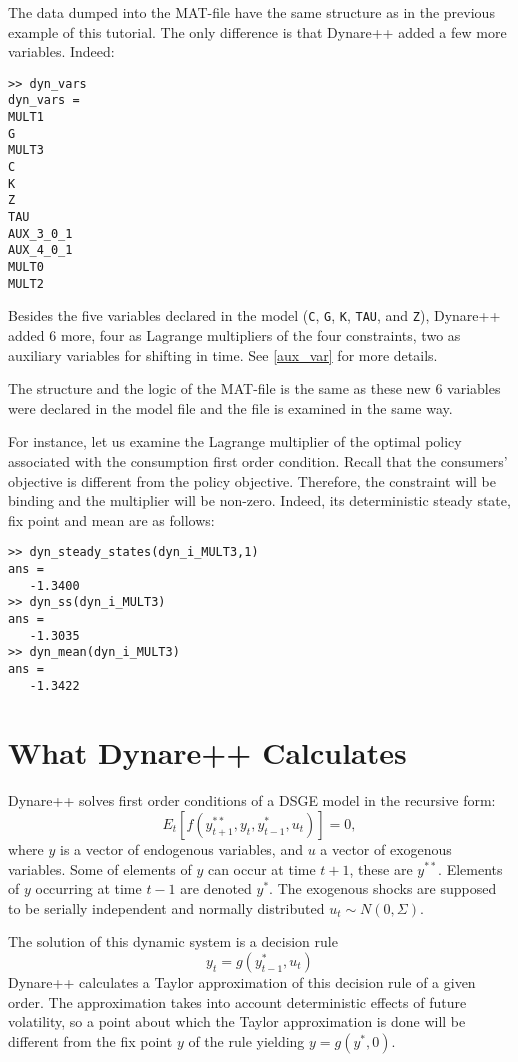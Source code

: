 \documentclass[10pt]{article}
\begin{document}
The data dumped into the MAT-file have the same structure as in the
previous example of this tutorial. The only difference is that
Dynare++ added a few more variables. Indeed:
{\small
\begin{verbatim}
>> dyn_vars
dyn_vars =
MULT1    
G        
MULT3    
C        
K        
Z        
TAU      
AUX_3_0_1
AUX_4_0_1
MULT0    
MULT2    
\end{verbatim}
}
Besides the five variables declared in the model ({\tt C}, {\tt G},
{\tt K}, {\tt TAU}, and {\tt Z}), Dy\-na\-re++ added 6 more, four as Lagrange
multipliers of the four constraints, two as auxiliary variables for
shifting in time. See \ref{aux_var} for more details.

The structure and the logic of the MAT-file is the same as these new 6
variables were declared in the model file and the file is examined in
the same way.

For instance, let us examine the Lagrange multiplier of the optimal
policy associated with the consumption first order condition. Recall
that the consumers' objective is different from the policy
objective. Therefore, the constraint will be binding and the
multiplier will be non-zero. Indeed, its deterministic steady state,
fix point and mean are as follows:
{\small
\begin{verbatim}
>> dyn_steady_states(dyn_i_MULT3,1)
ans =
   -1.3400
>> dyn_ss(dyn_i_MULT3)
ans =
   -1.3035
>> dyn_mean(dyn_i_MULT3)
ans =
   -1.3422
\end{verbatim}
}

\section{What Dynare++ Calculates}
\label{dynpp_calc}

Dynare++ solves first order conditions of a DSGE model in the recursive form:
\begin{equation}\label{focs}
E_t[f(y^{**}_{t+1},y_t,y^*_{t-1},u_t)]=0,
\end{equation}
where $y$ is a vector of endogenous variables, and $u$ a vector of
exogenous variables. Some of elements of $y$ can occur at time $t+1$,
these are $y^{**}$. Elements of $y$ occurring at time $t-1$ are denoted
$y^*$. The exogenous shocks are supposed to be serially independent
and normally distributed $u_t\sim N(0,\Sigma)$.

The solution of this dynamic system is a decision rule
\[
y_t=g(y^*_{t-1},u_t)
\]
Dynare++ calculates a Taylor approximation of this decision rule of a
given order. The approximation takes into account deterministic
effects of future volatility, so a point about which the Taylor
approximation is done will be different from the fix point $y$ of the rule
yielding $y=g(y^*,0)$.
\end{document}
